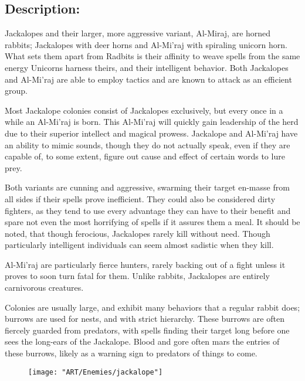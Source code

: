 \documentclass[11pt,a4paper,twocolumn]{book}
\begin{document}
	\subsection*{Description:}
	Jackalopes and their larger, more aggressive variant, Al-Miraj, are horned rabbits; Jackalopes with deer horns and Al-Mi'raj with spiraling unicorn horn. What sets them apart from Radbits is their affinity to weave spells from the same energy Unicorns harness theirs, and their intelligent behavior. Both Jackalopes and Al-Mi'raj are able to employ tactics and are known to attack as an efficient group.
	
	Most Jackalope colonies consist of Jackalopes exclusively, but every once in a while an Al-Mi'raj is born. This Al-Mi'raj will quickly gain leadership of the herd due to their superior intellect and magical prowess. Jackalope and Al-Mi'raj have an ability to mimic sounds, though they do not actually speak, even if they are capable of, to some extent, figure out cause and effect of certain words to lure prey.
	
	Both variants are cunning and aggressive, swarming their target en-masse from all sides if their spells prove inefficient. They could also be considered dirty fighters, as they tend to use every advantage they can have to their benefit and spare not even the most horrifying of spells if it assures them a meal. It should be noted, that though ferocious, Jackalopes rarely kill without need. Though particularly intelligent individuals can seem almost sadistic when they kill.
	
	\bigskip
	Al-Mi'raj are particularly fierce hunters, rarely backing out of a fight unless it proves to soon turn fatal for them. Unlike rabbits, Jackalopes are entirely carnivorous creatures.
	
	Colonies are usually large, and exhibit many behaviors that a regular rabbit does; burrows are used for nests, and with strict hierarchy. These burrows are often fiercely guarded from predators, with spells finding their target long before one sees the long-ears of the Jackalope. Blood and gore often mars the entries of these burrows, likely as a warning sign to predators of things to come.
	
	\begin{figure}
		\centering
		\texttt{[image: "ART/Enemies/jackalope"]}
	\end{figure}
	
	\clearpage
	
\end{document}
